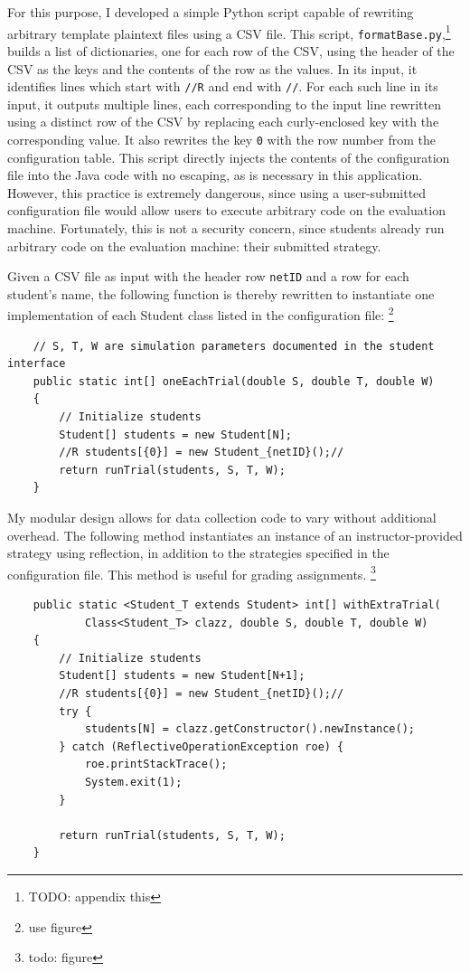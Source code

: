 \documentclass[pageno]{jpaper}
\begin{document}
For this purpose, I developed a simple Python script capable of rewriting arbitrary template plaintext files using a CSV file.
This script, \texttt{formatBase.py},\footnote{TODO: appendix this} builds a list of dictionaries, one for each row of the CSV, using the header of the CSV as the keys and the contents of the row as the values.
In its input, it identifies lines which start with \texttt{//R} and end with \texttt{//}.
For each such line in its input, it outputs multiple lines, each corresponding to the input line rewritten using a distinct row of the CSV by replacing each curly-enclosed key with the corresponding value.
It also rewrites the key \texttt{0} with the row number from the configuration table.
This script directly injects the contents of the configuration file into the Java code with no escaping, as is necessary in this application.
However, this practice is extremely dangerous, since using a user-submitted configuration file would allow users to execute arbitrary code on the evaluation machine.
Fortunately, this is not a security concern, since students already run arbitrary code on the evaluation machine: their submitted strategy.

Given a CSV file as input with the header row \texttt{netID} and a row for each student's name, the following function is thereby rewritten to instantiate one implementation of each Student class listed in the configuration file:
\footnote{use figure}
\begin{verbatim}
    // S, T, W are simulation parameters documented in the student interface
    public static int[] oneEachTrial(double S, double T, double W)
    {
        // Initialize students
        Student[] students = new Student[N];
        //R students[{0}] = new Student_{netID}();//
        return runTrial(students, S, T, W);
    }
\end{verbatim}
My modular design allows for data collection code to vary without additional overhead.
The following method instantiates an instance of an instructor-provided strategy using reflection, in addition to the strategies specified in the configuration file.
This method is useful for grading assignments.
\footnote{todo: figure}
\begin{verbatim}
    public static <Student_T extends Student> int[] withExtraTrial(
            Class<Student_T> clazz, double S, double T, double W)
    {
        // Initialize students
        Student[] students = new Student[N+1];
        //R students[{0}] = new Student_{netID}();//
        try {
            students[N] = clazz.getConstructor().newInstance();
        } catch (ReflectiveOperationException roe) {
            roe.printStackTrace();
            System.exit(1);
        }

        return runTrial(students, S, T, W);
    }
\end{verbatim}
\end{document}
